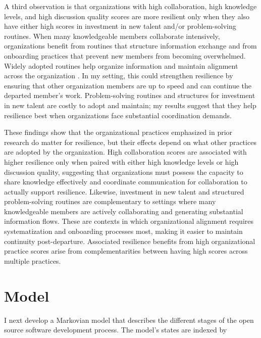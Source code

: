 \documentclass[12pt,notitlepage]{article}
\begin{document}
A third observation is that organizations with high collaboration, high knowledge levels, and high discussion quality scores are more resilient only when they also have either high scores in investment in new talent and/or problem-solving routines.
When many knowledgeable members collaborate intensively, organizations benefit from routines that structure information exchange and from onboarding practices that prevent new members from becoming overwhelmed.
Widely adopted routines help organize information and maintain alignment across the organization \citep{home_resilience_1997}.
In my setting, this could strengthen resilience by ensuring that other organization members are up to speed and can continue the departed member's work. 
Problem-solving routines and structures for investment in new talent are costly to adopt and maintain; my results suggest that they help resilience best when organizations face substantial coordination demands.

These findings show that the organizational practices emphasized in prior research do matter for resilience, but their effects depend on what other practices are adopted by the organization. 
High collaboration scores are associated with higher resilience only when paired with either high knowledge levels or high discussion quality, suggesting that organizations must possess the capacity to share knowledge effectively and coordinate communication for collaboration to actually support resilience. 
Likewise, investment in new talent and structured problem-solving routines are complementary to settings  where many knowledgeable members are actively collaborating and generating substantial information flows.
These are contexts in which organizational alignment requires systematization and onboarding processes most, making it easier to maintain continuity post-departure.
Associated resilience benefits from high organizational practice scores arise from complementarities between having high scores across multiple practices. 



\section{Model}\label{sec:model}

I next develop a Markovian model that describes the different stages of the open source software development process. 
The model's states are indexed by 
\end{document}
